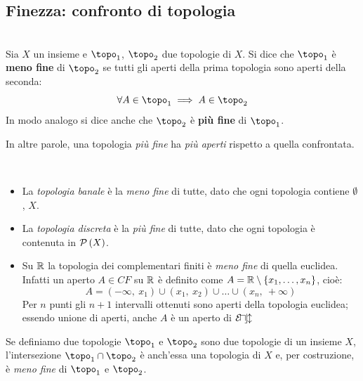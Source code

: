 \subsection{Finezza: confronto di topologia}
\begin{define}[Finezza.]~{}\\
Sia $X$ un insieme e $\topo_1$, $\topo_2$ due topologie di $X$. Si dice che $\topo_1$ è \textbf{meno fine} di $\topo_2$ se tutti gli aperti della prima topologia sono aperti della seconda:
\vspace{-2mm}
\begin{equation}
\forall A\in\topo_1\implies A\in \topo_2
\end{equation}
In modo analogo si dice anche che $\topo_2$ è \textbf{più fine} di $\topo_1$.
\end{define}
In altre parole, una topologia \textit{più fine} ha \textit{più aperti} rispetto a quella confrontata.
\begin{examples}~{}
\begin{itemize}
\item La \textit{topologia banale} è la \textit{meno fine} di tutte, dato che ogni topologia contiene $\emptyset$, $X$.
\item La \textit{topologia discreta} è la \textit{più fine} di tutte, dato che ogni topologia è contenuta in $\mathcal{P}\left(X\right)$.
\item Su $\mathbb{R}$ la topologia dei complementari finiti è \textit{meno fine} di quella euclidea. Infatti un aperto $A\in CF$ su $\mathbb{R}$ è definito come $A=\mathbb{R}\setminus\left\{x_1,\ldots,x_n\right\}$, cioè:
\begin{equation*}
A=\left(-\infty,\ x_1\right)\cup\left(x_1,\ x_2\right)\cup\ldots\cup\left(x_n,\ +\infty\right)
\end{equation*}
Per $n$ punti gli $n+1$ intervalli ottenuti sono aperti della topologia euclidea; essendo unione di aperti, anche $A$ è un aperto di $\mathcal{E\! u\! c\! l}$
\end{itemize}
\vspace{-3mm}
\end{examples}
\begin{observe}\label{intersezionetopo}
	Se definiamo due topologie $\topo_1$ e $\topo_2$ sono due topologie di un insieme $X$, l'intersezione $\topo_1\cap\topo_2$ è anch'essa una topologia di $X$ e, per costruzione, è \textit{meno fine} di $\topo_1$ e $\topo_2$.
\end{observe}

